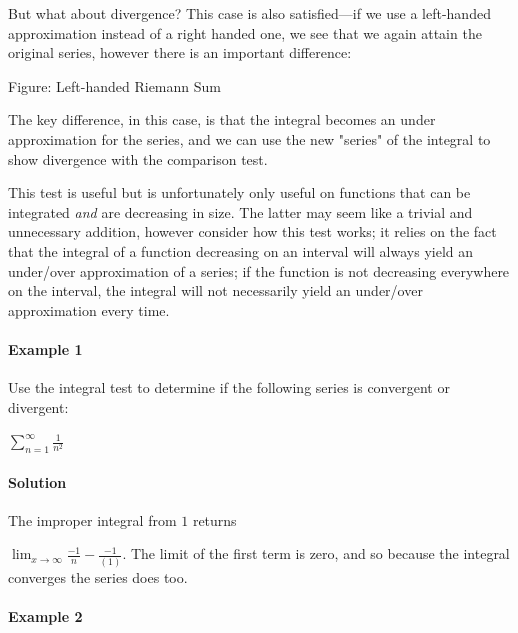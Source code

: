 But what about divergence? This case is also satisfied---if we use a left-handed approximation instead of a right handed one, we see that we again attain the original series, however there is an important difference:








Figure: Left-handed Riemann Sum



The key difference, in this case, is that the integral becomes an under approximation for the series, and we can use the new "series" of the integral to show divergence with the comparison test.



This test is useful but is unfortunately only useful on functions that can be integrated \textit{and} are decreasing in size. The latter may seem like a trivial and unnecessary addition, however consider how this test works; it relies on the fact that the integral of a function decreasing on an interval will always yield an under/over approximation of a series; if the function is not decreasing everywhere on the interval, the integral will not necessarily yield an under/over approximation every time.



\paragraph{Example 1}



Use the integral test to determine if the following series is convergent or divergent:



$\sum _{n=1}^{\infty}{\frac{1}{n^2}}$



\paragraph{Solution}



The improper integral from $1$ returns

$\lim _{x \rightarrow \infty} \frac{-1}{n} - \frac{-1}{(1)}$. The limit of the first term is zero, and so because the integral converges the series does too.



\paragraph{Example 2}




